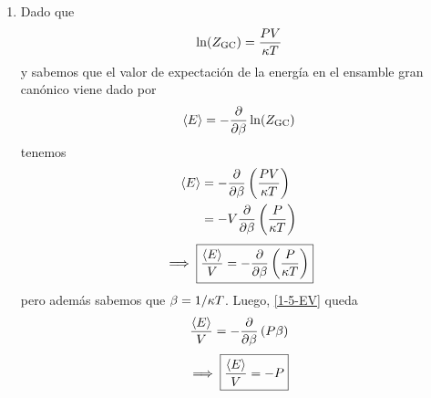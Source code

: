 \begin{sol}
\begin{enumerate}
\
	\item 

	Dado que 
	\begin{equation}
  \ln(Z_{\rm GC} )=\frac{PV}{\kappa T}
\end{equation}
y sabemos que el valor de expectación de la energía en el ensamble gran canónico viene dado por
\begin{equation}
  \ev{E}=-\pdv{\b}\ln(\zgc )
\end{equation}
tenemos
\begin{align}
  \ev{E}&=-\pdv{\b}\left(\frac{PV}{\k T}\right)\\
  &=-V\pdv{\b}\left(\frac{P}{\k T}\right)
\end{align}
\begin{equation}\label{1-5-EV}
  \implies \boxed{\frac{\ev{E}}{V}=-\pdv{\b}\left(\frac{P}{\k T}\right)}
\end{equation}
pero además sabemos que $\beta =1/\kappa T$. Luego, \eqref{1-5-EV} queda
\begin{equation}
  \frac{\ev{E}}{V}=-\pdv{\b}\left(P \b \right)
\end{equation}
\begin{equation}
  \implies \boxed{\frac{\ev{E}}{V}=-P}
\end{equation}


\end{enumerate}
\end{sol}
